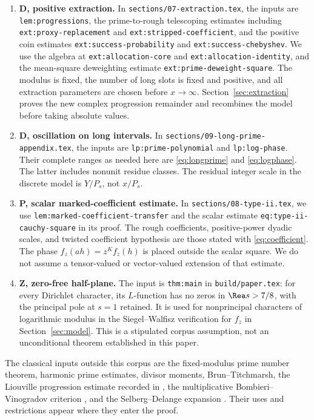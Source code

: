 \begin{enumerate}[leftmargin=*,itemsep=8pt]
\item \textbf{D, positive extraction.}
In \texttt{sections/07-extraction.tex}, the inputs are
\texttt{lem:progressions}, the prime-to-rough telescoping estimates
including \texttt{ext:proxy-replacement} and
\texttt{ext:stripped-coefficient}, and the positive coin estimates
\texttt{ext:success-probability} and \texttt{ext:success-chebyshev}.
We use the algebra at \texttt{ext:allocation-core} and
\texttt{ext:allocation-identity}, and the mean-square deweighting
estimate \texttt{ext:prime-deweight-square}.
The modulus is fixed, the number of long slots is fixed and positive,
and all extraction parameters are chosen before $x\to\infty$.
Section~\ref{sec:extraction} proves the new complex progression
remainder and recombines the model before taking absolute values.

\item \textbf{D, oscillation on long intervals.}
In \texttt{sections/09-long-prime-appendix.tex}, the inputs are
\texttt{lp:prime-polynomial} and \texttt{lp:log-phase}.
Their complete ranges as needed here are
\eqref{eq:longprime} and \eqref{eq:logphase}. The latter includes
nonunit residue classes. The residual integer scale in the discrete
model is $Y/P_s$, not $x/P_s$.

\item \textbf{P, scalar marked-coefficient estimate.}
In \texttt{sections/08-type-ii.tex}, we use
\texttt{lem:marked-coefficient-transfer} and the scalar estimate
\texttt{eq:type-ii-cauchy-square} in its proof.
The rough coefficients, positive-power dyadic scales, and twisted
coefficient hypothesis are those stated with
\eqref{eq:coefficient}. The phase $f_z(ah)=z^Kf_z(h)$ is placed
outside the scalar square. We do not assume a tensor-valued or
vector-valued extension of that estimate.

\item \textbf{Z, zero-free half-plane.}
The input is \texttt{thm:main} in \texttt{build/paper.tex}:
for every Dirichlet character, its $L$-function has no zeros in
$\Rea s>7/8$, with the principal pole at $s=1$ retained.
It is used for nonprincipal characters of logarithmic modulus in
the Siegel--Walfisz verification for $f_z$ in
Section~\ref{sec:model}. This is a stipulated corpus assumption,
not an unconditional theorem established in this paper.
\end{enumerate}
\endgroup

The classical inputs outside this corpus are the fixed-modulus prime
number theorem, harmonic prime estimates, divisor moments,
Brun--Titchmarsh, the Liouville progression estimate recorded in
\cite{Pintz}, the multiplicative Bombieri--Vinogradov criterion
\cite{GS}, and the Selberg--Delange expansion \cite{BT}.
Their uses and restrictions appear where they enter the proof.
